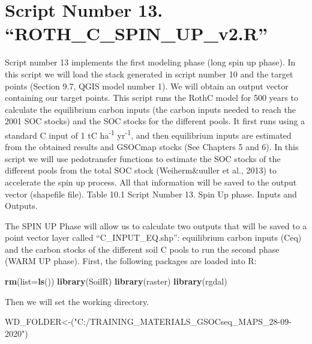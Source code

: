 \documentclass[
  10pt,
  b5paper,
]{book}
\newenvironment{Shaded}{\begin{snugshade}}{\end{snugshade}}
\newcommand{\DataTypeTok}[1]{\textcolor[rgb]{0.13,0.29,0.53}{#1}}
\newcommand{\KeywordTok}[1]{\textcolor[rgb]{0.13,0.29,0.53}{\textbf{#1}}}
\newcommand{\NormalTok}[1]{#1}
\newcommand{\StringTok}[1]{\textcolor[rgb]{0.31,0.60,0.02}{#1}}
\begin{document}
\hypertarget{script-number-13.-roth_c_spin_up_v2.r}{%
\section{Script Number 13. ``ROTH\_C\_SPIN\_UP\_v2.R''}\label{script-number-13.-roth_c_spin_up_v2.r}}

Script number 13 implements the first modeling phase (long spin up phase). In this script we will load the stack generated in script number 10 and the target points (Section 9.7, QGIS model number 1). We will obtain an output vector containing our target points. This script runs the RothC model for 500 years to calculate the equilibrium carbon inputs (the carbon inputs needed to reach the 2001 SOC stocks) and the SOC stocks for the different pools. It first runs using a standard C input of 1 tC ha\textsuperscript{-1} yr\textsuperscript{-1}, and then equilibrium inputs are estimated from the obtained results and GSOCmap stocks (See Chapters 5 and 6). In this script we will use pedotransfer functions to estimate the SOC stocks of the different pools from the total SOC stock (Weiherm\&uuller et al., 2013) to accelerate the spin up process. All that information will be saved to the output vector (shapefile file).
Table 10.1 Script Number 13. Spin Up phase. Inputs and Outputs.

The SPIN UP Phase will allow us to calculate two outputs that will be saved to a point vector layer called ``C\_INPUT\_EQ.shp'': equilibrium carbon inputs (Ceq) and the carbon stocks of the different soil C pools to run the
second phase (WARM UP phase).
First, the following packages are loaded into R:

\begin{Shaded}
\begin{Highlighting}[]
\KeywordTok{rm}\NormalTok{(}\DataTypeTok{list=}\KeywordTok{ls}\NormalTok{()) }
\KeywordTok{library}\NormalTok{(SoilR)}
\KeywordTok{library}\NormalTok{(raster)}
\KeywordTok{library}\NormalTok{(rgdal)}
\end{Highlighting}
\end{Shaded}

Then we will set the working directory.

\begin{Shaded}
\begin{Highlighting}[]
\NormalTok{WD_FOLDER<-(}\StringTok{"C:/TRAINING_MATERIALS_GSOCseq_MAPS_28-09-2020"}\NormalTok{)}
\end{Highlighting}
\end{Shaded}
\end{document}
